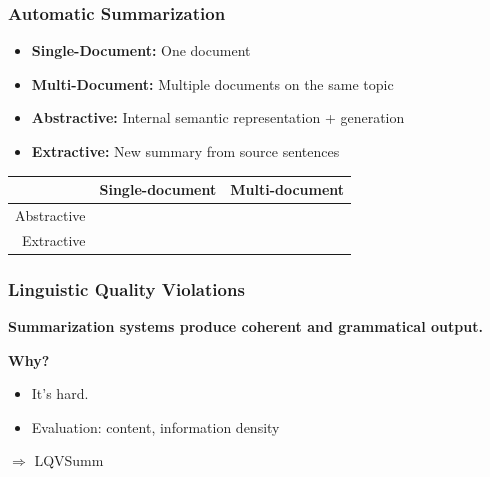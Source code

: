\documentclass[table]{beamer}
\begin{document}
\begin{frame}
  \frametitle{Automatic Summarization}
  \begin{itemize}
    \item \textbf{Single-Document:} One document
    \item \textbf{Multi-Document:} Multiple documents on the same topic
  \end{itemize}
  \pause
  \begin{itemize}
    \item \textbf{Abstractive:} Internal semantic representation + generation
    \item \textbf{Extractive:} New summary from source sentences
  \end{itemize}
  \pause
  \vspace{1cm}

  \quad \quad \quad \begin{tabular}{r|c|c|}
    & Single-document & Multi-document\\
    \hline
    Abstractive & \cellcolor{red!25} & \cellcolor{red!25}\\
    \hline
    Extractive & \cellcolor{red!25} & \cellcolor{green!25}\\
    \hline
  \end{tabular}
\end{frame}

\begin{frame}
  \frametitle{Linguistic Quality Violations}
  \textbf{Summarization systems  produce coherent and grammatical output.}
  \pause

  \textbf{Why?}
  \begin{itemize}
    \item It's hard.\pause
    \item Evaluation: content, information density
  \end{itemize}
  \vspace{1cm}
  \pause
  $\Rightarrow$ LQVSumm \citep{friedrichlqvsumm}


\end{frame}
\end{document}
